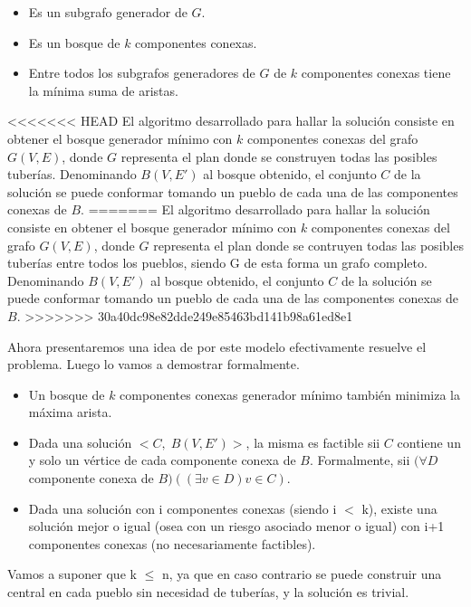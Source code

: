 \begin{itemize}
  \item Es un subgrafo generador de $G$.

  \item Es un bosque de $k$ componentes conexas.

  \item Entre todos los subgrafos generadores de $G$ de $k$ componentes conexas tiene la mínima suma de aristas.
\end{itemize}

<<<<<<< HEAD
El algoritmo desarrollado para hallar la solución consiste en obtener el bosque generador mínimo con $k$ componentes conexas del grafo $G(V,E)$, donde $G$ representa el plan donde se construyen todas las posibles tuberías. Denominando $B(V,E')$ al bosque obtenido, el conjunto $C$ de la solución se puede conformar tomando un pueblo de cada una de las componentes conexas de $B$.
=======
El algoritmo desarrollado para hallar la solución consiste en obtener el bosque generador mínimo con $k$ componentes conexas del grafo $G(V,E)$, donde $G$ representa el plan donde se contruyen todas las posibles tuberías entre todos los pueblos, siendo G de esta forma un grafo completo. Denominando $B(V,E')$ al bosque obtenido, el conjunto $C$ de la solución se puede conformar tomando un pueblo de cada una de las componentes conexas de $B$.
>>>>>>> 30a40dc98e82dde249e85463bd141b98a61ed8e1

Ahora presentaremos una idea de por este modelo efectivamente resuelve el problema. Luego lo vamos a demostrar formalmente. 

\begin{itemize}
\item Un bosque de $k$ componentes conexas generador mínimo también minimiza la máxima arista.

\item Dada una solución $<C,\;B(V,E')>$, la misma es factible sii $C$ contiene un y solo un vértice de cada componente conexa de $B$. Formalmente, sii $(\forall D$ componente conexa de $B)((\exists v \in D) v \in C)$.  

\item Dada una solución con i componentes conexas (siendo i $<$ k), existe una solución mejor o igual (osea con un riesgo asociado menor o igual) con i+1 componentes conexas (no necesariamente factibles).
\end{itemize}

Vamos a suponer que k $\leq$ n, ya que en caso contrario se puede construir una central en cada pueblo sin necesidad de tuberías, y la solución es trivial.